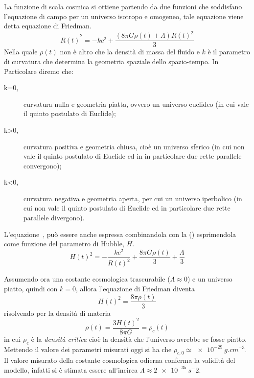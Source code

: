 La funzione di scala cosmica si ottiene partendo da due funzioni che soddisfano l'equazione di campo per un universo isotropo e omogeneo, tale equazione viene detta equazione di Friedman.
\begin{equation}\label{eq:friedman}
    {\dot{R}(t)}^2 = -kc^2 + \frac{(8 \pi G \rho(t)+\Lambda) {R(t)}^2}{3}
\end{equation}
Nella quale $\rho(t)$ non è altro che la densità di massa del fluido e $k$ è il parametro di curvatura che determina la geometria spaziale dello spazio-tempo. In Particolare diremo che:
\begin{description}
    \item[k=0,] curvatura nulla e geometria piatta, ovvero un universo euclideo (in cui vale il quinto postulato di Euclide);
    \item[k>0,] curvatura positiva e geometria chiusa, cioè un universo sferico (in cui non vale il quinto postulato di Euclide ed in in particolare due rette parallele convergono);
    \item[k<0,] curvatura negativa e geometria aperta, per cui un universo iperbolico  (in cui non vale il quinto postulato di Euclide ed in particolare due rette parallele divergono).
\end{description}

L'equazione~, può essere anche espressa combinandola con la () esprimendola come funzione del parametro di Hubble, $H$.
\begin{equation}\label{eq:friedman-hubble}
    {H(t)}^2 = - \frac{kc^2}{{R(t)}^2} + \frac{8\pi G \rho (t)}{3} + \frac{\Lambda}{3}
\end{equation}

Assumendo ora una costante cosmologica trascurabile ($\Lambda \approx 0$) e un universo piatto, quindi con $k = 0$, allora l'equazione di Friedman diventa
\[
    {H(t)}^2 = \frac{8 \pi \rho (t)}{3}
\]
risolvendo per la densità di materia
\[
    \rho (t) = \frac{3 {H(t)}^2}{8 \pi G} = \rho_c (t)
\]
in cui $\rho_c$ è la \textit{densità critica} cioè la densità che l'universo avrebbe se fosse piatto. Mettendo il valore dei parametri misurati oggi si ha che $\rho_{c,0} \simeq \SI{e-29}{g.cm^{-3}}$. Il valore misurato della costante cosmologica odierna conferma la validità del modello, infatti si è stimata essere all'incirca $\Lambda \approx \SI{2e-35}{s^-2}$.


